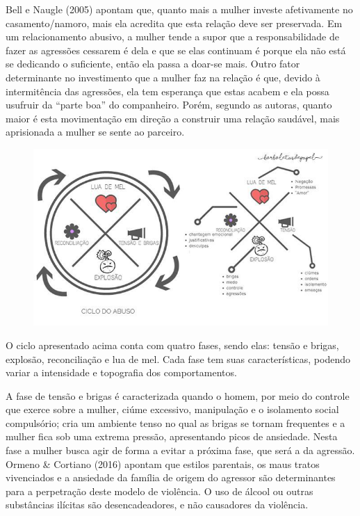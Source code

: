 Bell e Naugle (2005) apontam que, quanto mais a mulher investe afetivamente no casamento/namoro, mais ela acredita que esta relação deve ser preservada. Em um relacionamento abusivo, a mulher tende a supor que a responsabilidade de fazer as agressões cessarem é dela e que se elas continuam é porque ela não está se dedicando o suficiente, então ela passa a doar-se mais. Outro fator determinante no investimento que a mulher faz na relação é que, devido à intermitência das agressões, ela tem esperança que estas acabem e ela possa usufruir da ``parte boa'' do companheiro. Porém, segundo as autoras, quanto maior é esta movimentação em direção a construir uma relação saudável, mais aprisionada a mulher se sente ao parceiro.

\begin{figure}[ht]
    \includegraphics[width=1\textwidth]{10/figura1.png}
\end{figure}

O ciclo apresentado acima conta com quatro fases, sendo elas: tensão e brigas, explosão, reconciliação e lua de mel. Cada fase tem suas características, podendo variar a intensidade e topografia dos comportamentos.

A fase de tensão e brigas é caracterizada quando o homem, por meio do controle que exerce sobre a mulher, ciúme excessivo, manipulação e o isolamento social compulsório; cria um ambiente tenso no qual as brigas se tornam frequentes e a mulher fica sob uma extrema pressão, apresentando picos de ansiedade. Nesta fase a mulher busca agir de forma a evitar a próxima fase, que será a da agressão. Ormeno \& Cortiano (2016) apontam que estilos parentais, os maus tratos vivenciados e a ansiedade da família de origem do agressor são determinantes para a perpetração deste modelo de violência. O uso de álcool ou outras substâncias ilícitas são desencadeadores, e não causadores da violência.

